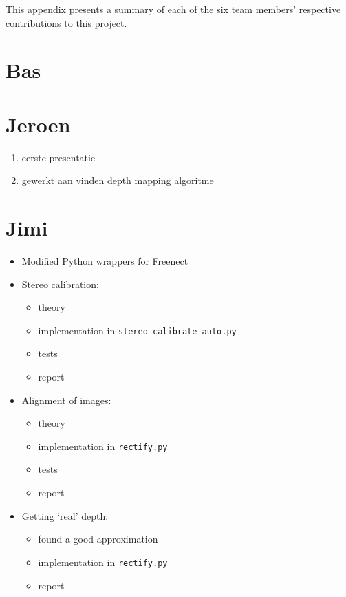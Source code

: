 This appendix presents a summary of each of the six team members' respective
contributions to this project.


\section*{Bas}


\section*{Jeroen}
\begin{enumerate}
\item eerste presentatie
\item gewerkt aan vinden depth mapping algoritme
\end{enumerate}

\section*{Jimi}
\begin{itemize}
\item Modified Python wrappers for Freenect
\item Stereo calibration:
    \begin{itemize}
        \item theory
        \item implementation in \verb|stereo_calibrate_auto.py|
        \item tests
        \item report
    \end{itemize}
\item Alignment of images:
    \begin{itemize}
        \item theory
        \item implementation in \verb|rectify.py|
        \item tests
        \item report
    \end{itemize}
\item Getting `real' depth:
    \begin{itemize}
        \item found a good approximation
        \item implementation in \verb|rectify.py|
        \item report
    \end{itemize}
\end{itemize}

